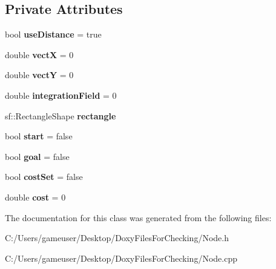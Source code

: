 \subsection*{Private Attributes}
\begin{DoxyCompactItemize}
\item 
\mbox{\label{class_node_ad2af1003bff44ae41540d812e7d6a43f}} 
bool {\bfseries use\+Distance} = true
\item 
\mbox{\label{class_node_aad84ff62bb1ee73058dea68759b92b33}} 
double {\bfseries vectX} = 0
\item 
\mbox{\label{class_node_a07546c605cfcb7bd8819c5dbfeb67a39}} 
double {\bfseries vectY} = 0
\item 
\mbox{\label{class_node_aed83b557f50b4891d285aa1c0fbff485}} 
double {\bfseries integration\+Field} = 0
\item 
\mbox{\label{class_node_a83fb85bdafcc4a764b6b6b8c31b63b4c}} 
sf\+::\+Rectangle\+Shape {\bfseries rectangle}
\item 
\mbox{\label{class_node_a1d5854f89d8291b5790f6c428ee293ff}} 
bool {\bfseries start} = false
\item 
\mbox{\label{class_node_a8452fe942107b0ca329892da2dbbbfbc}} 
bool {\bfseries goal} = false
\item 
\mbox{\label{class_node_a054e3940b7350c170fe70a367e6e9746}} 
bool {\bfseries cost\+Set} = false
\item 
\mbox{\label{class_node_a6e7b74adca863064ca0d1684873f33e0}} 
double {\bfseries cost} = 0
\end{DoxyCompactItemize}


The documentation for this class was generated from the following files\+:\begin{DoxyCompactItemize}
\item 
C\+:/\+Users/gameuser/\+Desktop/\+Doxy\+Files\+For\+Checking/Node.\+h\item 
C\+:/\+Users/gameuser/\+Desktop/\+Doxy\+Files\+For\+Checking/Node.\+cpp\end{DoxyCompactItemize}
